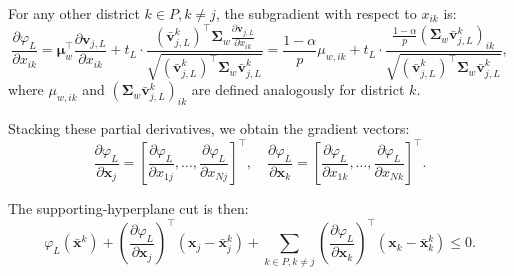 \documentclass[preprint,12pt,authoryear]{elsarticle}
\begin{document}
For any other district $k \in P, k \neq j$, the subgradient with respect to $x_{ik}$ is:
\begin{equation}
\frac{\partial \varphi_L}{\partial x_{ik}} = \boldsymbol{\mu}_w^\top \frac{\partial \mathbf{v}_{j,L}}{\partial x_{ik}} + t_L \cdot \frac{(\bar{\mathbf{v}}_{j,L}^k)^\top \boldsymbol{\Sigma}_w \frac{\partial \mathbf{v}_{j,L}}{\partial x_{ik}}}{\sqrt{(\bar{\mathbf{v}}_{j,L}^k)^\top \boldsymbol{\Sigma}_w \bar{\mathbf{v}}_{j,L}^k}} = \frac{1-\alpha}{p} \mu_{w,ik} + t_L \cdot \frac{\frac{1-\alpha}{p} (\boldsymbol{\Sigma}_w \bar{\mathbf{v}}_{j,L}^k)_{ik}}{\sqrt{(\bar{\mathbf{v}}_{j,L}^k)^\top \boldsymbol{\Sigma}_w \bar{\mathbf{v}}_{j,L}^k}},
\label{eq:assign_dep_rel_subgradient_L_ik}
\end{equation}
where $\mu_{w,ik}$ and $(\boldsymbol{\Sigma}_w \bar{\mathbf{v}}_{j,L}^k)_{ik}$ are defined analogously for district $k$.

Stacking these partial derivatives, we obtain the gradient vectors:
\begin{equation}
\frac{\partial \varphi_L}{\partial \mathbf{x}_j} = \left[\frac{\partial \varphi_L}{\partial x_{1j}}, \ldots, \frac{\partial \varphi_L}{\partial x_{Nj}}\right]^\top, \quad \frac{\partial \varphi_L}{\partial \mathbf{x}_k} = \left[\frac{\partial \varphi_L}{\partial x_{1k}}, \ldots, \frac{\partial \varphi_L}{\partial x_{Nk}}\right]^\top.
\label{eq:assign_dep_rel_subgradient_vectors_L}
\end{equation}

The supporting-hyperplane cut is then:
\begin{equation}
\varphi_L(\bar{\mathbf{x}}^k) + \left(\frac{\partial \varphi_L}{\partial \mathbf{x}_j}\right)^\top (\mathbf{x}_j - \bar{\mathbf{x}}_j^k) + \sum_{k \in P, k \neq j} \left(\frac{\partial \varphi_L}{\partial \mathbf{x}_k}\right)^\top (\mathbf{x}_k - \bar{\mathbf{x}}_k^k) \leqslant 0.
\label{eq:assign_dep_rel_balance_d2_supporting_cut_lower}
\end{equation}
\end{document}
